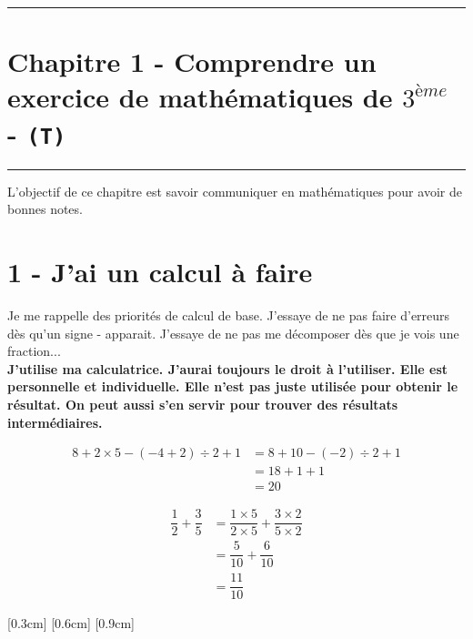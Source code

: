 \documentclass[11pt]{article}
\newcommand{\horrule}[1]{\rule{\linewidth}{#1}} %
\begin{document}
\setlength{\columnseprule}{1pt}

\horrule{2px}
\section*{Chapitre 1 - Comprendre un exercice de mathématiques de $3^{ème}$ - \texttt{(T)}}
\horrule{2px}

L'objectif de ce chapitre est savoir communiquer en mathématiques pour avoir de bonnes notes. 

\section*{1 - J'ai un calcul à faire}

Je me rappelle des priorités de calcul de base. J'essaye de ne pas faire d'erreurs dès qu'un signe - apparait. J'essaye de ne pas me décomposer dès que je vois une fraction... \\

\textbf{J'utilise ma calculatrice. J'aurai toujours le droit à l'utiliser. Elle est personnelle et individuelle. Elle n'est pas juste utilisée pour obtenir le résultat. On peut aussi s'en servir pour trouver des résultats intermédiaires.}

\begin{align*}
8 +  2 \times 5 - (-4 + 2) \div 2 + 1 &= 8 + 10 - (-2) \div 2 + 1 \\
                                      &= 18 + 1  +1 \\
                                      &= 20
\end{align*}


\begin{align*}
\dfrac{1}{2} + \dfrac{3}{5} &= \dfrac{1 \times 5}{2 \times 5} + \dfrac{3 \times 2}{5 \times 2} \\
                            &= \dfrac{5}{10} + \dfrac{6}{10} \\
                            &= \dfrac{11}{10}
\end{align*}

\begin{center}\reversemarginpar\marginnote{$\Box \Box$}
\reversemarginpar\marginnote{$\Box \Box$}[0.3cm]
\reversemarginpar\marginnote{$\Box \Box$}[0.6cm]
\reversemarginpar\marginnote{$\Box \Box$}[0.9cm]
\end{center}
\end{document}
